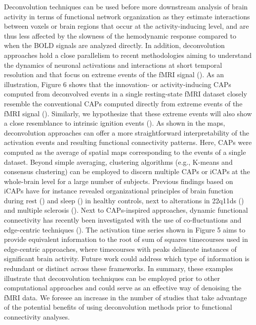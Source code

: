 Deconvolution techniques can be used before more downstream analysis of brain activity in terms of functional network organization as they estimate interactions between voxels or brain regions that occur at the activity-inducing level, and are thus less affected by the slowness of the hemodynamic response compared to when the BOLD signals are analyzed directly. In addition, deconvolution approaches hold a close parallelism to recent methodologies aiming to understand the dynamics of neuronal activations and interactions at short temporal resolution and that focus on extreme events of the fMRI signal (\citealt{Lindquist_2007}). As an illustration, Figure 6 shows that the innovation- or activity-inducing CAPs computed from deconvolved events in a single resting-state fMRI dataset closely resemble the conventional CAPs computed directly from extreme events of the fMRI signal (\citealt{Liu2013Timevaryingfunctional,Liu2013Decompositionspontaneousbrain,Liu2018Coactivationpatterns,cifre2020revisiting,Cifre2020Furtherresultswhy,Zhang2020relationshipBOLDneural,Tagliazucchi2011,Tagliazucchi2012,Tagliazucchi2016,Rolls2021}). Similarly, we hypothesize that these extreme events will also show a close resemblance to intrinsic ignition events (\citealt{Deco2017a,Deco2017}). As shown in the maps, deconvolution approaches can offer a more straightforward interpretability of the activation events and resulting functional connectivity patterns. Here, CAPs were computed as the average of spatial maps corresponding to the events of a single dataset. Beyond simple averaging, clustering algorithms (e.g., K-means and consensus clustering) can be employed to discern multiple CAPs or iCAPs at the whole-brain level for a large number of subjects. Previous findings based on iCAPs have for instance revealed organizational principles of brain function during rest (\citealt{Karahanoglu2015Transientbrainactivity}) and sleep (\citealt{tarun2101}) in healthy controls, next to alterations in 22q11ds (\citealt{zoller1902}) and multiple sclerosis (\citealt{bommarito2101p}). Next to CAPs-inspired approaches, dynamic functional connectivity has recently been investigated with the use of co-fluctuations and edge-centric techniques (\citealt{Faskowitz2020,Esfahlani2020Highamplitudecofluctuations,Jo2021,Sporns2021,Oort2018}). The activation time series shown in Figure 5 aims to provide equivalent information to the root of sum of squares timecourses used in edge-centric approaches, where timecourses with peaks delineate instances of significant brain activity. Future work could address which type of information is redundant or distinct across these frameworks. In summary, these examples illustrate that deconvolution techniques can be employed prior to other computational approaches and could serve as an effective way of denoising the fMRI data. We foresee an increase in the number of studies that take advantage of the potential benefits of using deconvolution methods prior to functional connectivity analyses.

